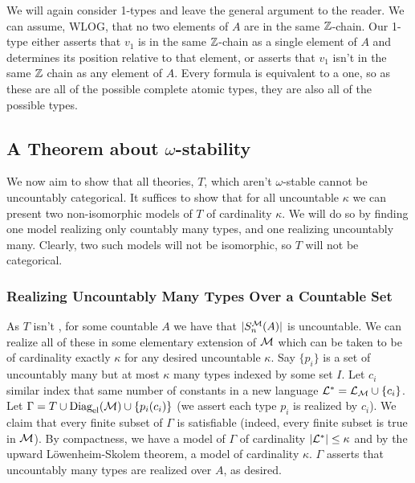 We will again consider 1-types and leave the general argument to the reader. 
We can assume, WLOG, that no two elements of \(A\) are in the same \(\mathbb{Z}\)-chain. 
Our 1-type either asserts that \(v_1\) is in the same \(\mathbb{Z}\)-chain as a single element of \(A\) and determines its position relative to that element, or asserts that \(v_1\) isn't in the same \(\mathbb{Z}\) chain as any element of \(A\). 
Every formula is equivalent to a \qf one, so as these are all of the possible complete atomic types, they are also all of the possible types.    

\subsection{A Theorem about \(\omega\)-stability}

We now aim to show that all theories, \(T\), which aren't \(\omega\)-stable cannot be uncountably categorical.
It suffices to show that for all uncountable \(\kappa\) we can present two non-isomorphic models of \(T\) of cardinality \(\kappa\). 
We will do so by finding one model realizing only countably many types, and one realizing uncountably many. 
Clearly, two such models will not be isomorphic, so \(T\) will not be categorical. 

\subsubsection{Realizing Uncountably Many Types Over a Countable Set}
As \(T\) isn't \omst, for some countable \(A\) we have that \(|S_n^{\mathcal{M}}(A)|\) is uncountable. 
We can realize all of these in some elementary extension of \(\mathcal{M}\) which can be taken to be of cardinality exactly \(\kappa\) for any desired uncountable \(\kappa\). 
Say \(\{p_i\}\) is a set of uncountably many but at most \(\kappa\) many types indexed by some set \(I\). 
Let \(c_i\) similar index that same number of constants in a new language \(\mathcal{L}^* = \mathcal{L}_{\mathcal{M}} \cup \{c_i\}\). 
Let \(\Gamma = T \cup \text{Diag}_\text{el}(\mathcal{M}) \cup \{p_i(c_i)\}\) (we assert each type \(p_i\) is realized by \(c_i\)). 
We claim that every finite subset of \(\Gamma\) is satisfiable (indeed, every finite subset is true in \(\mathcal{M}\)).
By compactness, we have a model of \(\Gamma\) of cardinality \(|\mathcal{L}^*| \leq \kappa\) and by the upward L\"owenheim-Skolem theorem, a model of cardinality \(\kappa\).
\(\Gamma\) asserts that uncountably many types are realized over \(A\), as desired. 

